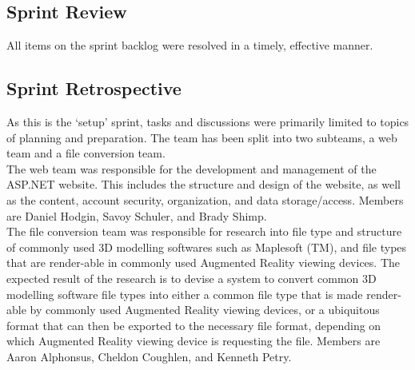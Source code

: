     \subsection{Sprint Review}
    \label{sec:Sprint0_review}
        \hspace{7mm}
        All items on the sprint backlog were resolved in a timely, effective manner.

    \subsection{Sprint Retrospective}
    \label{sec:Sprint0_retrospective}
        \hspace{7mm}
        As this is the `setup' sprint, tasks and discussions were primarily limited to topics of planning and preparation.
        The team has been split into two subteams, a web team and a file conversion team.\\ 

        The web team was responsible for the development and management of the ASP.NET website.  This includes the
        structure and design of the website,  as well as the content, account security, organization, and data 
        storage/access.  Members are Daniel Hodgin, Savoy Schuler, and Brady Shimp.\\

        The file conversion team was responsible for research into file type and structure of commonly used 3D modelling
        softwares such as Maplesoft (TM), and file types that are render-able in commonly used Augmented Reality viewing devices.
        The expected result of the research is to devise a system to convert common 3D modelling software file types into either
        a common file type that is made render-able by commonly used Augmented Reality viewing devices, or a ubiquitous format
        that can then be exported to the necessary file format, depending on which Augmented Reality viewing device is 
        requesting the file. Members are Aaron Alphonsus, Cheldon Coughlen, and Kenneth Petry.